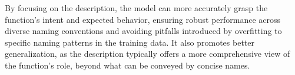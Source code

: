 \documentclass{article}
\begin{document}





By focusing on the description, the model can more accurately grasp the function’s intent and expected behavior, ensuring robust performance across diverse naming conventions and avoiding pitfalls introduced by overfitting to specific naming patterns in the training data. It also promotes better generalization, as the description typically offers a more comprehensive view of the function's role, beyond what can be conveyed by concise names.
\end{document}
